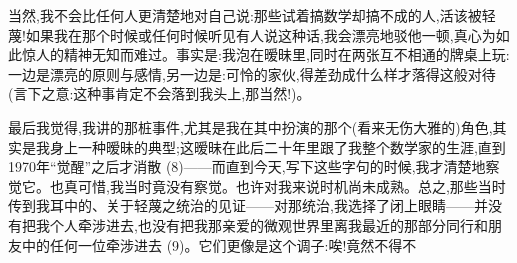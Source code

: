 当然,我不会比任何人更清楚地对自己说:那些试着搞数学却搞不成的人,活该被轻蔑!如果我在那个时候或任何时候听见有人说这种话,我会漂亮地驳他一顿,真心为如此惊人的精神无知而难过。事实是:我泡在暧昧里,同时在两张互不相通的牌桌上玩:一边是漂亮的原则与感情,另一边是:可怜的家伙,得差劲成什么样才落得这般对待(言下之意:这种事肯定不会落到我头上,那当然!)。

最后我觉得,我讲的那桩事件,尤其是我在其中扮演的那个(看来无伤大雅的)角色,其实是我身上一种暧昧的典型;这暧昧在此后二十年里跟了我整个数学家的生涯,直到1970年“觉醒”之后才消散 (8)——而直到今天,写下这些字句的时候,我才清楚地察觉它。也真可惜,我当时竟没有察觉。也许对我来说时机尚未成熟。总之,那些当时传到我耳中的、关于轻蔑之统治的见证——对那统治,我选择了闭上眼睛——并没有把我个人牵涉进去,也没有把我那亲爱的微观世界里离我最近的那部分同行和朋友中的任何一位牵涉进去 (9)。它们更像是这个调子:唉!竟然不得不%
